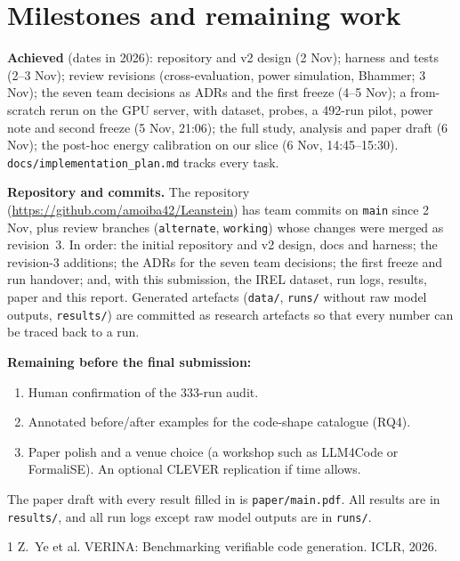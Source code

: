 \documentclass[10pt,twocolumn]{article}
\begin{document}
\section{Milestones and remaining work}
\textbf{Achieved} (dates in 2026): repository and v2 design (2 Nov); harness and tests (2--3 Nov); review
revisions (cross-evaluation, power simulation, Bhammer; 3 Nov); the seven team decisions as ADRs and the first
freeze (4--5 Nov); a from-scratch rerun on the GPU server, with dataset, probes, a 492-run pilot, power note and
second freeze (5 Nov, 21:06); the full study, analysis and paper draft (6 Nov); the post-hoc energy calibration
on our slice (6 Nov, 14:45--15:30).
\texttt{docs/implementation\_plan.md} tracks every task.

\textbf{Repository and commits.} The repository (\url{https://github.com/amoiba42/Leanstein}) has team commits
on \texttt{main} since 2 Nov, plus review branches (\texttt{alternate}, \texttt{working}) whose
changes were merged as revision~3. In order: the initial repository and v2 design, docs and harness; the
revision-3 additions; the ADRs for the seven team decisions; the first freeze and run handover; and, with this
submission, the IREL dataset, run logs, results, paper and this report. Generated artefacts (\texttt{data/},
\texttt{runs/} without raw model outputs, \texttt{results/}) are committed as research artefacts so that every
number can be traced back to a run.

\textbf{Remaining before the final submission:}
\begin{enumerate}
\item Human confirmation of the 333-run audit.
\item Annotated before/after examples for the code-shape catalogue (RQ4).
\item Paper polish and a venue choice (a workshop such as LLM4Code or FormaliSE). An optional CLEVER replication if
time allows.
\end{enumerate}
The paper draft with every result filled in is \texttt{paper/main.pdf}. All results are in \texttt{results/},
and all run logs except raw model outputs are in \texttt{runs/}.

{\small

\begin{thebibliography}{1}\setlength{\itemsep}{0pt}
 Z.~Ye et al. VERINA: Benchmarking verifiable code generation. ICLR, 2026.
\end{thebibliography}}
\end{document}
